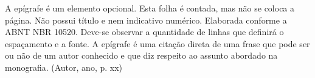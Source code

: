 A epígrafe é um elemento opcional. Esta folha é contada, mas não se coloca a
página. Não possui título e nem indicativo numérico. Elaborada conforme a ABNT
NBR 10520. Deve-se observar a quantidade de linhas que definirá o espaçamento
e a fonte. A epígrafe é uma citação direta de uma frase que pode ser ou não de
um autor conhecido e que diz respeito ao assunto abordado na monografia.
(Autor, ano, p. xx)

